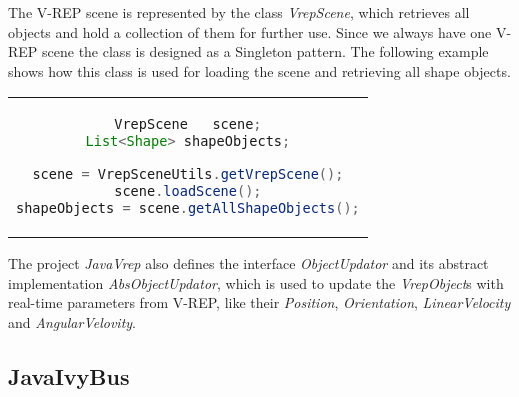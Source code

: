 The V-REP scene is represented by the class \textit{VrepScene}, which retrieves all objects and hold a collection of them for further use. Since we always have one V-REP scene the class is designed as a Singleton pattern. The following example shows how this class is used for loading the scene and retrieving all shape objects.

\begin{center}
\begin{tabular}{c}
\begin{lstlisting}[basicstyle=\small, language=Java]
VrepScene   scene;
List<Shape> shapeObjects;

scene = VrepSceneUtils.getVrepScene();
scene.loadScene();
shapeObjects = scene.getAllShapeObjects();

\end{lstlisting}
\end{tabular}
\end{center}

The project \textit{JavaVrep} also defines the interface \textit{ObjectUpdator} and its abstract implementation \textit{AbsObjectUpdator}, which is used to update the \textit{VrepObject}s with real-time parameters from V-REP, like their \textit{Position}, \textit{Orientation}, \textit{LinearVelocity} and \textit{AngularVelovity}.


\subsection{JavaIvyBus}
\label{sec:ivyBusImplementation}

